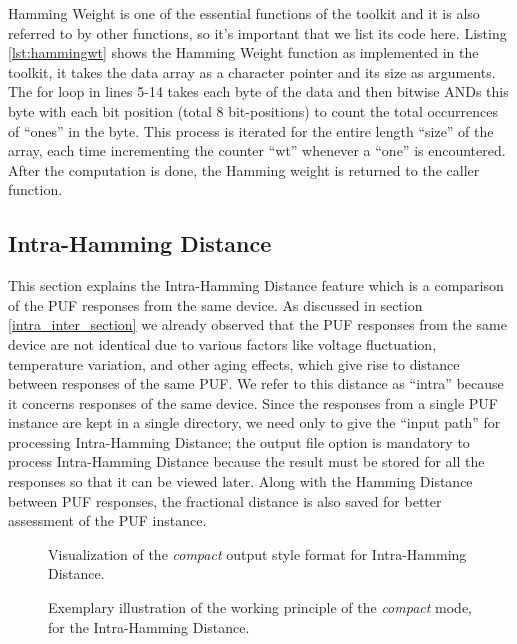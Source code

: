 Hamming Weight is one of the essential functions of the toolkit and it is also referred to by other functions, so it's important that we list its code here. Listing \ref{lst:hammingwt} shows the Hamming Weight function as implemented in the toolkit, it takes the data array as a character pointer and its size as arguments. The for loop in lines 5-14 takes each byte of the data and then bitwise ANDs this byte with each bit position (total 8 bit-positions) to count the total occurrences of
``ones'' in the byte. This process is
iterated for the entire length ``size'' of the array, each time incrementing the counter ``wt'' whenever a ``one'' is encountered. After the computation is done, the Hamming weight is returned to the caller function.

\subsection{Intra-Hamming Distance}
\label{intra_hd_section}
This section explains the Intra-Hamming Distance feature which is a comparison of the PUF responses from the same device. As discussed in section \ref{intra_inter_section} we already observed that the PUF responses from the same device are not identical due to various factors like voltage fluctuation,  temperature variation, and other aging effects, which give rise to distance between responses of the same PUF. We refer to this distance as ``intra'' because it concerns responses of the same
device. Since the responses from a single PUF instance are kept in a single directory, we need only to give the ``input path'' for processing Intra-Hamming Distance; the output file option is mandatory to process Intra-Hamming Distance because the result must be stored for all the responses so that it can be viewed later. Along with the Hamming Distance between PUF responses, the fractional distance is also saved for better assessment of the PUF instance.\\

\begin{figure}[h!]
\centering
{}
\caption{Visualization of the \emph{compact} output style format for Intra-Hamming Distance.}
\label{img:4_intra_compact}
\end{figure}

\begin{figure}[]
\centering
{}
\caption{Exemplary illustration of the working principle of the \emph{compact} mode, for the Intra-Hamming Distance.}
\label{img:4_intra_WP}
\end{figure}


